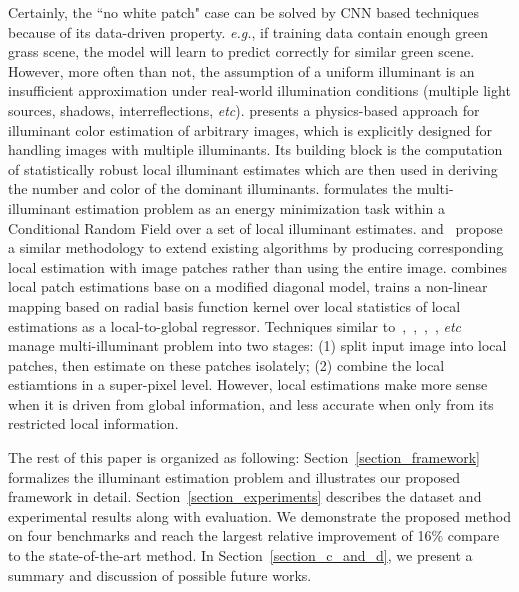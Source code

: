 \documentclass[10pt,twocolumn,letterpaper]{article}
\begin{document}
Certainly, the ``no white patch" case can be solved by CNN based techniques because of its data-driven property.
\textit{e.g.}, if training data contain enough green grass scene,
the model will learn to predict correctly for similar green scene.
However, more often than not, the assumption of a uniform illuminant is an insufficient approximation under
real-world illumination conditions (multiple light sources, shadows, interreflections, \textit{etc}).
\cite{riess2011illuminant} presents a physics-based approach for illuminant color estimation of arbitrary images,
which is explicitly designed for handling images with multiple illuminants.
Its building block is the computation of statistically robust local illuminant estimates which
are then used in deriving the number and color of the dominant illuminants.
\cite{beigpour2014multi} formulates the multi-illuminant estimation problem as an energy minimization task within
a Conditional Random Field over a set of local illuminant estimates.
\cite{bianco2015single} and~\cite{gijsenij2012color} propose a similar methodology to extend existing algorithms
by producing corresponding local estimation with image patches rather than using the entire image.
\cite{gijsenij2012color} combines local patch estimations base on a modified diagonal model,
\cite{bianco2015single} trains a non-linear mapping based on radial basis function kernel over
local statistics of local estimations as a local-to-global regressor.
Techniques similar to~\cite{riess2011illuminant},~\cite{beigpour2014multi},~\cite{gijsenij2012color},~\cite{bianco2015single}, \textit{etc}
manage multi-illuminant problem into two stages: (1) split input image into local patches,
then estimate on these patches isolately; (2) combine the local estiamtions in a super-pixel level.
However, local estimations make more sense when it is driven from global information,
and less accurate when only from its restricted local information.

The rest of this paper is organized as following: Section~\ref{section_framework} formalizes the illuminant estimation problem
and illustrates our proposed framework in detail.
Section~\ref{section_experiments} describes the dataset and experimental results along with evaluation.
We demonstrate the proposed method on four benchmarks and reach the largest relative improvement of
16\%
compare to the state-of-the-art method.
In Section~\ref{section_c_and_d}, we present a summary and discussion of possible future works.
\end{document}
